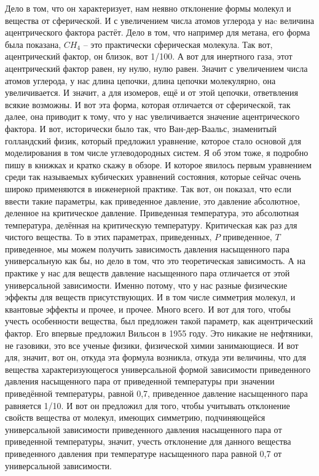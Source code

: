 \documentclass[main.tex]{subfiles}
\begin{document}
Дело в том, что он характеризует, нам неявно отклонение формы молекул и вещества от сферической.
И с увеличением числа атомов углерода у наc величина ацентрического фактора растёт.
Дело в том, что например для метана, его форма была показана, $CH_4$ -- это практически сферическая молекула.
Так вот, ацентрический фактор, он близок, вот 1/100.
А вот для инертного газа, этот ацентрический фактор равен, ну нулю, нулю равен.
Значит с увеличением числа атомов углерода, у нас длина цепочки, длина цепочки молекулярно, она увеличивается.
И значит, а для изомеров, ещё и от этой цепочки, ответвления всякие возможны.
И вот эта форма, которая отличается от сферической, так далее, она приводит к тому, что у нас увеличивается значение ацентрического фактора.
И вот, исторически было так, что Ван-дер-Ваальс, знаменитый голландский физик, который предложил уравнение, которое стало основой для моделирования в том числе углеводородных систем.
Я об этом тоже, я подробно пишу в книжках и кратко скажу в обзоре.
И которое явилось первым уравнением среди так называемых кубических уравнений состояния, которые сейчас очень широко применяются в инженерной практике.
Так вот, он показал, что если ввести такие параметры, как приведенное давление, это давление абсолютное, деленное на критическое давление.
Приведенная температура, это абсолютная температура, делённая на критическую температуру.
Критическая как раз для чистого вещества.
То в этих параметрах, приведенных, $P$ приведенное, $T$ приведенное, мы можем получить зависимость давления насыщенного пара универсальную как бы, но дело в том, что это теоретическая зависимость.
А на практике у нас для веществ давление насыщенного пара отличается от этой универсальной зависимости.
Именно потому, что у нас разные физические эффекты для веществ присутствующих.
И в том числе симметрия молекул, и квантовые эффекты и прочее, и прочее.
Много всего.
И вот для того, чтобы учесть особенности вещества, был предложен такой параметр, как ацентрический фактор.
Его впервые предложил Вильсон в 1955 году.
Это никакие не нефтяники, не газовики, это все ученые физики, физической химии занимающиеся.
И вот для, значит, вот он, откуда эта формула возникла, откуда эти величины, что для вещества характеризующегося универсальной формой зависимости приведенного давления насыщенного пара от приведенной температуры при значении приведённой температуры, равной 0,7, приведенное давление насыщенного пара равняется 1/10.
И вот он предложил для того, чтобы учитывать отклонение свойств вещества от молекул, имеющих симметрию, подчиняющейся универсальной зависимости приведенного давления насыщенного пара от приведенной температуры, значит, учесть отклонение для данного вещества приведенного давления при температуре насыщенного пара равной 0,7 от универсальной зависимости.
\end{document}
